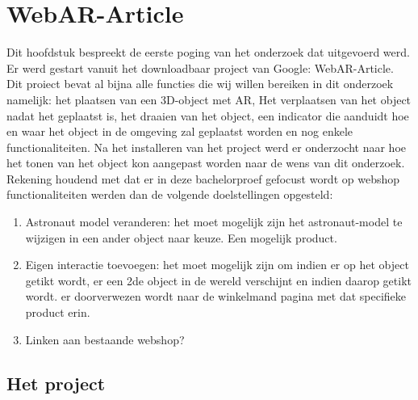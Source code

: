 
\chapter{WebAR-Article}
\label{ch:webar-article}


Dit hoofdstuk bespreekt de eerste poging van het onderzoek dat uitgevoerd werd. Er werd gestart vanuit het downloadbaar project van Google: WebAR-Article. Dit proiect bevat al bijna alle functies die wij willen bereiken in dit onderzoek namelijk: het plaatsen van een 3D-object met AR, Het verplaatsen van het object nadat het geplaatst is, het draaien van het object, een indicator die aanduidt hoe en waar het object in de omgeving zal geplaatst worden en nog enkele functionaliteiten. 
Na het installeren van het project werd er onderzocht naar hoe het tonen van het object kon aangepast worden naar de wens van dit onderzoek. Rekening houdend met dat er in deze bachelorproef gefocust wordt op webshop functionaliteiten werden dan de volgende doelstellingen opgesteld: 

\begin{enumerate}
	\item Astronaut model veranderen: het moet mogelijk zijn het astronaut-model te wijzigen in een ander object naar keuze. Een mogelijk product.
	\item Eigen interactie toevoegen: het moet mogelijk zijn om indien er op het object getikt wordt, er een 2de object in de wereld verschijnt en indien daarop getikt wordt. er doorverwezen wordt naar de winkelmand pagina met dat specifieke product erin.  
	\item Linken aan bestaande webshop? 

\end{enumerate}

\section{Het project}
\label{sec:het-project}

